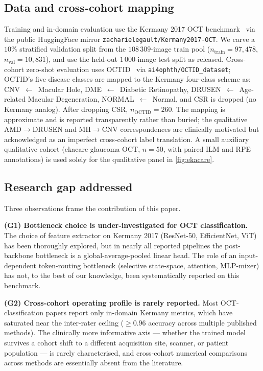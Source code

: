 \documentclass[5p]{elsarticle}
\begin{document}
\subsection{Data and cross-cohort mapping}
\label{sec:method-data}
Training and in-domain evaluation use the Kermany 2017 OCT benchmark~\citep{kermany2018identifying} via the public HuggingFace mirror \texttt{zacharielegault/Kermany2017-OCT}. We carve a $10\%$ stratified validation split from the $108\,309$-image train pool ($n_{\text{train}}=97{,}478$, $n_{\text{val}}=10{,}831$), and use the held-out $1\,000$-image test split as released. Cross-cohort zero-shot evaluation uses OCTID~\citep{gholami2020octid} via \texttt{ai4ophth/OCTID\_dataset}; OCTID's five disease classes are mapped to the Kermany four-class scheme as: CNV~$\leftarrow$~Macular Hole, DME~$\leftarrow$~Diabetic Retinopathy, DRUSEN~$\leftarrow$~Age-related Macular Degeneration, NORMAL~$\leftarrow$~Normal, and CSR is dropped (no Kermany analog). After dropping CSR, $n_{\text{OCTID}}=260$. The mapping is approximate and is reported transparently rather than buried; the qualitative AMD$\rightarrow$DRUSEN and MH$\rightarrow$CNV correspondences are clinically motivated but acknowledged as an imperfect cross-cohort label translation. A small auxiliary qualitative cohort (ekacare glaucoma OCT, $n=50$, with paired ILM and RPE annotations) is used solely for the qualitative panel in \cref{fig:ekacare}.

\subsection{Research gap addressed}
\label{sec:gap}
Three observations frame the contribution of this paper.

\textbf{(G1) Bottleneck choice is under-investigated for OCT classification.} The choice of feature extractor on Kermany 2017 (ResNet-50, EfficientNet, ViT) has been thoroughly explored, but in nearly all reported pipelines the post-backbone bottleneck is a global-average-pooled linear head. The role of an input-dependent token-routing bottleneck (selective state-space, attention, MLP-mixer) has not, to the best of our knowledge, been systematically reported on this benchmark.

\textbf{(G2) Cross-cohort operating profile is rarely reported.} Most OCT-classification papers report only in-domain Kermany metrics, which have saturated near the inter-rater ceiling ($\ge 0.96$ accuracy across multiple published methods). The clinically more informative axis --- whether the trained model survives a cohort shift to a different acquisition site, scanner, or patient population --- is rarely characterised, and cross-cohort numerical comparisons across methods are essentially absent from the literature.
\end{document}
